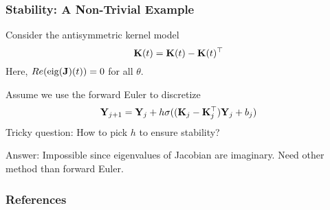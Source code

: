 \documentclass[12pt,fleqn,handout]{beamer}
\begin{document}
\begin{frame}[fragile]\frametitle{Stability: A Non-Trivial Example}

Consider the antisymmetric kernel model
$$
			{\bf K}(t) = {\bf K}(t) - {\bf K}(t)^\top
$$
Here, $Re({\rm eig}({\bf J})(t))= 0$ for all $\theta$.

\bigskip
\pause
			
Assume we use the forward Euler to discretize
$$ {\bf Y}_{j+1} = {\bf Y}_{j} + h \sigma( ({\bf K}_j-{\bf K}_j^\top) {\bf Y}_j + b_j) $$
Tricky question: How to pick $h$ to ensure stability?

\pause

Answer: Impossible since eigenvalues of Jacobian are imaginary. Need other method than forward Euler.
\end{frame}

\begin{frame}[allowframebreaks]
	\frametitle{References}



\end{frame}
\end{document}
